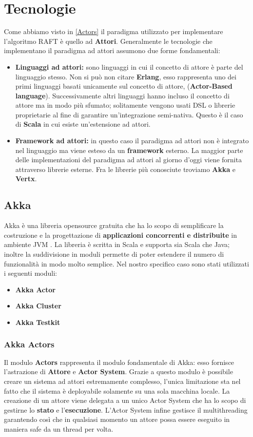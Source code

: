 \section{Tecnologie}
Come abbiamo visto in \ref{Actors} il paradigma utilizzato per implementare l'algoritmo RAFT è quello ad \textbf{Attori}. Generalmente le tecnologie che implementano il paradigma ad attori assumono due forme fondamentali:
\begin{itemize}
  \item{\textbf{Linguaggi ad attori:}}
  sono linguaggi in cui il concetto di attore è parte del linguaggio stesso. Non si può non citare \textbf{Erlang}, esso rappresenta uno dei primi linguaggi basati unicamente sul concetto di attore, (\textbf{Actor-Based language}). Successivamente altri linguaggi hanno incluso il concetto di attore ma in modo più sfumato; solitamente vengono usati DSL o librerie proprietarie al fine di garantire un'integrazione semi-nativa. Questo è il caso di \textbf{Scala} in cui esiste un'estensione ad attori.
  \item{\textbf{Framework ad attori:}}
  in questo caso il paradigma ad attori non è integrato nel linguaggio ma viene esteso da un \textbf{framework} esterno. La maggior parte delle implementazioni del paradigma ad attori al giorno d'oggi viene fornita attraverso librerie esterne. Fra le librerie più conosciute troviamo \textbf{Akka} e \textbf{Vertx}.
\end{itemize}

\subsection{Akka}
Akka è una libreria opensource gratuita che ha lo scopo di semplificare la costruzione e la progettazione di \textbf{applicazioni concorrenti e distribuite} in ambiente JVM \cite{akkaSite}. La libreria è scritta in Scala e supporta sia Scala che Java; inoltre la suddivisione in moduli permette di poter estendere il numero di funzionalità in modo molto semplice. Nel nostro specifico caso sono stati utilizzati i seguenti moduli:
\begin{itemize}
  \item{\textbf{Akka Actor}}
  \item{\textbf{Akka Cluster}}
  \item{\textbf{Akka Testkit}}
\end{itemize} 

  \subsubsection{Akka Actors}
  Il modulo \textbf{Actors} rappresenta il modulo fondamentale di Akka: esso fornisce l'astrazione di \textbf{Attore} e \textbf{Actor System}. Grazie a questo modulo è possibile creare un sistema ad attori estremamente complesso, l'unica limitazione sta nel fatto che il sistema è deployabile solamente su una sola macchina locale. La creazione di un attore viene delegata a un unico Actor System che ha lo scopo di gestirne lo \textbf{stato} e l'\textbf{esecuzione}. L'Actor System infine gestisce il multithreading garantendo così che in qualsiasi momento un attore possa essere eseguito in maniera safe da un thread per volta.   
